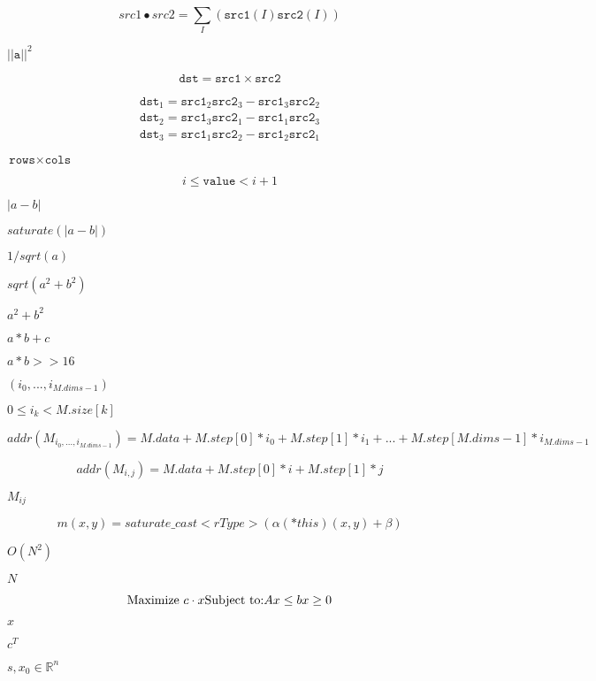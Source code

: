 \documentclass{article}
\begin{document}
\[src1 \bullet src2 = \sum _I ( \texttt{src1} (I) \texttt{src2} (I))\]
\pagebreak

$||\texttt{a}||^2$
\pagebreak

\[\texttt{dst} = \texttt{src1} \times \texttt{src2}\]
\pagebreak

\[\begin{array}{l} \texttt{dst} _1 = \texttt{src1} _2 \texttt{src2} _3 - \texttt{src1} _3 \texttt{src2} _2 \\ \texttt{dst} _2 = \texttt{src1} _3 \texttt{src2} _1 - \texttt{src1} _1 \texttt{src2} _3 \\ \texttt{dst} _3 = \texttt{src1} _1 \texttt{src2} _2 - \texttt{src1} _2 \texttt{src2} _1 \end{array}\]
\pagebreak

$\texttt{rows} \times \texttt{cols}$
\pagebreak

\[i \le \texttt{value} < i+1\]
\pagebreak

$ |a - b| $
\pagebreak

$ saturate(|a - b|) $
\pagebreak

$ 1/sqrt(a) $
\pagebreak

$ sqrt(a^2 + b^2) $
\pagebreak

$ a^2 + b^2 $
\pagebreak

$ a*b + c $
\pagebreak

$ a*b >> 16 $
\pagebreak

$(i_0,...,i_{M.dims-1})$
\pagebreak

$0\leq i_k<M.size[k]$
\pagebreak

\[addr(M_{i_0,...,i_{M.dims-1}}) = M.data + M.step[0]*i_0 + M.step[1]*i_1 + ... + M.step[M.dims-1]*i_{M.dims-1}\]
\pagebreak

\[addr(M_{i,j}) = M.data + M.step[0]*i + M.step[1]*j\]
\pagebreak

$M_{ij}$
\pagebreak

\[m(x,y) = saturate \_ cast<rType>( \alpha (*this)(x,y) + \beta )\]
\pagebreak

$O(N^2)$
\pagebreak

$N$
\pagebreak

\[\mbox{Maximize } c\cdot x\\ \mbox{Subject to:}\\ Ax\leq b\\ x\geq 0\]
\pagebreak

$x$
\pagebreak

$c^T$
\pagebreak

$s,x_0\in\mathbb{R}^n$
\pagebreak
\end{document}
